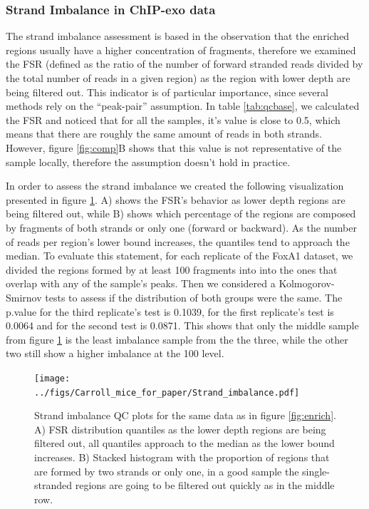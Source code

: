 \documentclass[11pt]{article}\usepackage[]{graphicx}\usepackage[]{color}
\begin{document}

\subsubsection{Strand Imbalance in ChIP-exo data}
\label{sec:strand_imbalance}

The strand imbalance assessment is based in the observation that the
enriched regions usually have a higher concentration of fragments,
therefore we examined the FSR (defined as the ratio of the number of
forward stranded reads divided by the total number of reads in a given
region) as the region with lower depth are being filtered out. This
indicator is of particular importance, since several methods rely on
the ``peak-pair'' assumption. In table \ref{tab:qcbase}, we calculated
the FSR and noticed that for all the samples, it's value is close to
0.5, which means that there are roughly the same amount of reads in
both strands. However, figure \ref{fig:comp}B shows that this value is
not representative of the sample locally, therefore the assumption
doesn't hold in practice.



In order to assess the strand imbalance we created the following
visualization presented in figure \ref{fig:strand}. A) shows the FSR's
behavior as lower depth regions are being filtered out, while B) shows
which percentage of the regions are composed by fragments of both
strands or only one (forward or backward). As the number of reads per
region's lower bound increases, the quantiles tend to approach the
median. To evaluate this statement, for each replicate of the FoxA1
dataset, we divided the regions formed by at least 100
fragments into into the ones that overlap with any of the sample's
peaks. Then we considered a Kolmogorov-Smirnov tests to assess if the
distribution of both groups were the same. The p.value for the third
replicate's test is 0.1039, for the first replicate's test
is 0.0064 and for the second test is
0.0871. This shows that only the middle sample from figure
\ref{fig:strand} is the least imbalance sample from the the three,
while the other two still show a higher imbalance at the 100
level.

\begin{figure}[H]
  \centering  
  \texttt{[image: ../figs/Carroll\_mice\_for\_paper/Strand\_imbalance.pdf]} 
  \caption{Strand imbalance QC plots for the same data as in figure
    \ref{fig:enrich}. A) FSR distribution quantiles as the lower depth
    regions are being filtered out, all quantiles approach to the
    median as the lower bound increases. B) Stacked histogram with the
    proportion of regions that are formed by two strands or only one,
    in a good sample the single-stranded regions are going to be
    filtered out quickly as in the middle row.}
  \label{fig:strand}
\end{figure}
\end{document}
